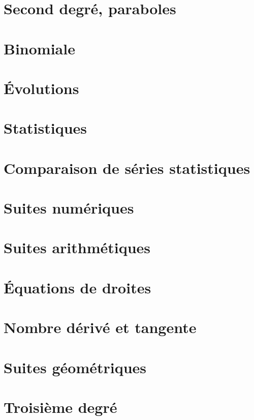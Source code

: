 \documentclass[a4paper,10pt]{book}
\begin{document}
\chapter{Second degré, paraboles}


\chapter{Binomiale}


\chapter{Évolutions}


\chapter{Statistiques}


\chapter{Comparaison de séries statistiques}


\chapter{Suites numériques}


\chapter{Suites arithmétiques}


\chapter{Équations de droites}


\chapter{Nombre dérivé et tangente}


\chapter{Suites géométriques}


\chapter{Troisième degré}

\end{document}
